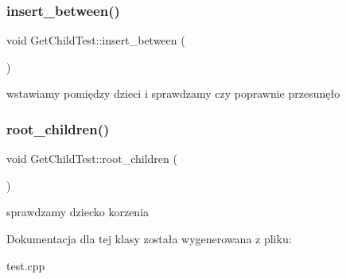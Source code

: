 \subsubsection{\texorpdfstring{insert\+\_\+between()}{insert\_between()}}
{\footnotesize\ttfamily void Get\+Child\+Test\+::insert\+\_\+between (\begin{DoxyParamCaption}{ }\end{DoxyParamCaption})\hspace{0.3cm}{\ttfamily [inline]}}

wstawiamy pomiędzy dzieci i sprawdzamy czy poprawnie przesunęło \mbox{\label{class_get_child_test_a1385e9059ba424b000d5e15ab28bd19b}} 
\subsubsection{\texorpdfstring{root\+\_\+children()}{root\_children()}}
{\footnotesize\ttfamily void Get\+Child\+Test\+::root\+\_\+children (\begin{DoxyParamCaption}{ }\end{DoxyParamCaption})\hspace{0.3cm}{\ttfamily [inline]}}

sprawdzamy dziecko korzenia 

Dokumentacja dla tej klasy została wygenerowana z pliku\+:\begin{DoxyCompactItemize}
\item 
test.\+cpp\end{DoxyCompactItemize}
